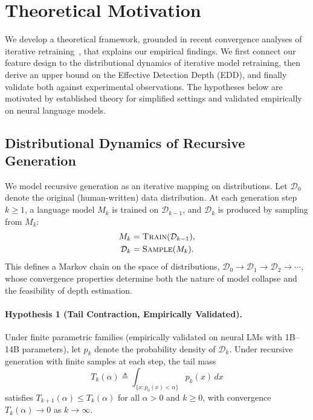 
\section{Theoretical Motivation}
\label{sec:theory}

We develop a theoretical framework, grounded in recent convergence analyses of iterative retraining~\citep{shumailov2024_nature,dohmatob2024_demystified,alemohammad2024_mad}, that explains our empirical findings. We first connect our feature design to the distributional dynamics of iterative model retraining, then derive an upper bound on the Effective Detection Depth (EDD), and finally validate both against experimental observations. The hypotheses below are motivated by established theory for simplified settings and validated empirically on neural language models.

\subsection{Distributional Dynamics of Recursive Generation}
\label{sec:theory:dynamics}

We model recursive generation as an iterative mapping on distributions. Let $\mathcal{D}_0$ denote the original (human-written) data distribution. At each generation step $k \geq 1$, a language model $M_k$ is trained on $\mathcal{D}_{k-1}$, and $\mathcal{D}_k$ is produced by sampling from $M_k$:
\begin{align}
    M_k &= \textsc{Train}(\mathcal{D}_{k-1}), \label{eq:train} \\
    \mathcal{D}_k &= \textsc{Sample}(M_k). \label{eq:sample}
\end{align}
This defines a Markov chain on the space of distributions, $\mathcal{D}_0 \to \mathcal{D}_1 \to \mathcal{D}_2 \to \cdots$, whose convergence properties determine both the nature of model collapse and the feasibility of depth estimation.

\paragraph{Hypothesis 1 (Tail Contraction, Empirically Validated).}
\label{thm:tail}
Under finite parametric families (empirically validated on neural LMs with 1B--14B parameters), let $p_k$ denote the probability density of $\mathcal{D}_k$. Under recursive generation with finite samples at each step, the tail mass
\begin{equation}
    T_k(\alpha) \triangleq \int_{\{x : p_0(x) < \alpha\}} p_k(x) \, dx
\end{equation}
satisfies $T_{k+1}(\alpha) \leq T_k(\alpha)$ for all $\alpha > 0$ and $k \geq 0$, with convergence $T_k(\alpha) \to 0$ as $k \to \infty$.

